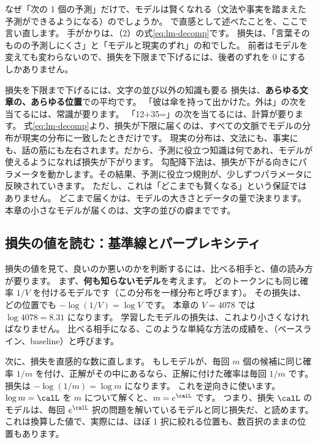 なぜ「次の 1 個の予測」だけで、モデルは賢くなれる（文法や事実を踏まえた予測ができるようになる）のでしょうか。
で直感として述べたことを、ここで言い直します。
手がかりは、（2）の式\eqref{eq:lm-decomp}です。
損失は、「言葉そのものの予測しにくさ」と「モデルと現実のずれ」の和でした。
前者はモデルを変えても変わらないので、損失を下限まで下げるには、後者のずれを 0 にするしかありません。

\begin{intuition}{損失を下限まで下げるには、文字の並び以外の知識も要る}
損失は、\textbf{あらゆる文章の、あらゆる位置}での平均です。
「彼は傘を持って出かけた。外は」の次を当てるには、常識が要ります。
「12+35=」の次を当てるには、計算が要ります。
式\eqref{eq:lm-decomp}より、損失が下限に届くのは、すべての文脈でモデルの分布が現実の分布に一致したときだけです。
現実の分布は、文法にも、事実にも、話の筋にも左右されます。だから、予測に役立つ知識は何であれ、モデルが使えるようになれば損失が下がります。
勾配降下法は、損失が下がる向きにパラメータを動かします。その結果、予測に役立つ規則が、少しずつパラメータに反映されていきます。
ただし、これは「どこまでも賢くなる」という保証ではありません。
どこまで届くかは、モデルの大きさとデータの量で決まります。本章の小さなモデルが届くのは、文字の並びの癖までです。
\end{intuition}

\subsection*{損失の値を読む：基準線とパープレキシティ}

損失の値を見て、良いのか悪いのかを判断するには、比べる相手と、値の読み方が要ります。
まず、\textbf{何も知らないモデル}を考えます。
どのトークンにも同じ確率 $1/V$ を付けるモデルです（この分布を一様分布と呼びます）。
その損失は、どの位置でも $-\log(1/V)=\log V$ です。
本章の $V=4078$ では $\log 4078=8.31$ になります。
学習したモデルの損失は、これより小さくなければなりません。
比べる相手になる、このような単純な方法の成績を、（ベースライン、baseline）と呼びます。

次に、損失を直感的な数に直します。
もしモデルが、毎回 $m$ 個の候補に同じ確率 $1/m$ を付け、正解がその中にあるなら、正解に付けた確率は毎回 $1/m$ です。
損失は $-\log(1/m)=\log m$ になります。
これを逆向きに使います。$\log m=\calL$ を $m$ について解くと、$m=e^{\calL}$ です。
つまり、損失 $\calL$ のモデルは、毎回 $e^{\calL}$ 択の問題を解いているモデルと同じ損失だ、と読めます。
これは換算した値で、実際には、ほぼ 1 択に絞れる位置も、数百択のままの位置もあります。

